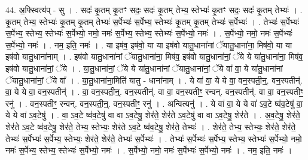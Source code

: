 \documentclass[17pt]{extarticle}
\begin{document}
44. अ॒फ्स्वित्य॑प् - सु । . सदः॑ कृ॒तम् कृ॒तꣳ सदः॒ सदः॑ कृ॒तम् तेभ्य॒ स्तेभ्यः॑ कृ॒तꣳ सदः॒ सदः॑ कृ॒तम् तेभ्यः॑ । . कृ॒तम् तेभ्य॒ स्तेभ्यः॑ कृ॒तम् कृ॒तम् तेभ्यः॑ स॒र्पेभ्यः॑ स॒र्पेभ्य॒ स्तेभ्यः॑ कृ॒तम् कृ॒तम् तेभ्यः॑ स॒र्पेभ्यः॑ । . तेभ्यः॑ स॒र्पेभ्यः॑ स॒र्पेभ्य॒ स्तेभ्य॒ स्तेभ्यः॑ स॒र्पेभ्यो॒ नमो॒ नमः॑ स॒र्पेभ्य॒ स्तेभ्य॒ स्तेभ्यः॑ स॒र्पेभ्यो॒ नमः॑ । . स॒र्पेभ्यो॒ नमो॒ नमः॑ स॒र्पेभ्यः॑ स॒र्पेभ्यो॒ नमः॑ । . नम॒ इति॒ नमः॑ । . या इष॑व॒ इष॑वो॒ या या इष॑वो यातु॒धाना॑नां ॅयातु॒धाना॑ना॒ मिष॑वो॒ या या इष॑वो यातु॒धाना॑नाम् । . इष॑वो यातु॒धाना॑नां ॅयातु॒धाना॑ना॒ मिष॑व॒ इष॑वो यातु॒धाना॑नां॒ ॅये ये या॑तु॒धाना॑ना॒ मिष॑व॒ इष॑वो यातु॒धाना॑नां॒ ॅये । . या॒तु॒धाना॑नां॒ ॅये ये या॑तु॒धाना॑नां ॅयातु॒धाना॑नां॒ ॅये वा॑ वा॒ ये या॑तु॒धाना॑नां ॅयातु॒धाना॑नां॒ ॅये वा᳚ । . या॒तु॒धाना॑ना॒मिति॑ यातु - धाना॑नाम् । . ये वा॑ वा॒ ये ये वा॒ वन॒स्पती॒न्॒. वन॒स्पतीन्॑. वा॒ ये ये वा॒ वन॒स्पतीन्॑ । . वा॒ वन॒स्पती॒न्॒. वन॒स्पतीन्॑. वा वा॒ वन॒स्पतीꣳ॒॒ रन्वन्. वन॒स्पतीन्॑. वा वा॒ वन॒स्पतीꣳ॒॒ रनु॑ । . वन॒स्पतीꣳ॒॒ रन्वन्. वन॒स्पती॒न्॒. वन॒स्पतीꣳ॒॒ रनु॑ । . अन्वित्यनु॑ । . ये वा॑ वा॒ ये ये वा॑ ऽव॒टे ष्व॑व॒टेषु॑ वा॒ ये ये वा॑ ऽव॒टेषु॑ । . वा॒ ऽव॒टे ष्व॑व॒टेषु॑ वा वा ऽव॒टेषु॒ शेर॑ते॒ शेर॑ते ऽव॒टेषु॑ वा वा ऽव॒टेषु॒ शेर॑ते । . अ॒व॒टेषु॒ शेर॑ते॒ शेर॑ते ऽव॒टे ष्व॑व॒टेषु॒ शेर॑ते॒ तेभ्य॒ स्तेभ्यः॒ शेर॑ते ऽव॒टे ष्व॑व॒टेषु॒ शेर॑ते॒ तेभ्यः॑ । . शेर॑ते॒ तेभ्य॒ स्तेभ्यः॒ शेर॑ते॒ शेर॑ते॒ तेभ्यः॑ स॒र्पेभ्यः॑ स॒र्पेभ्य॒ स्तेभ्यः॒ शेर॑ते॒ शेर॑ते॒ तेभ्यः॑ स॒र्पेभ्यः॑ । . तेभ्यः॑ स॒र्पेभ्यः॑ स॒र्पेभ्य॒ स्तेभ्य॒ स्तेभ्यः॑ स॒र्पेभ्यो॒ नमो॒ नमः॑ स॒र्पेभ्य॒ स्तेभ्य॒ स्तेभ्यः॑ स॒र्पेभ्यो॒ नमः॑ । . स॒र्पेभ्यो॒ नमो॒ नमः॑ स॒र्पेभ्यः॑ स॒र्पेभ्यो॒ नमः॑ । . नम॒ इति॒ नमः॑ । \newline
\pagebreak
{}
\end{document}
